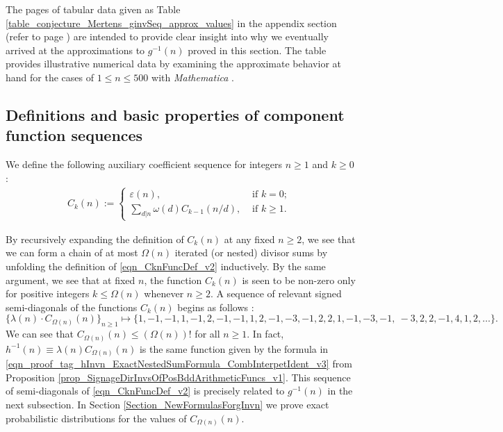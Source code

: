 \documentclass[11pt,reqno,a4letter]{article}
\numberwithin{figure}{section}
\numberwithin{table}{section}
\newcommand{\seqnum}[1]{\href{http://oeis.org/#1}{\color{ProcessBlue}{\underline{#1}}}}
\theoremstyle{plain}
\numberwithin{theorem}{section}
\theoremstyle{definition}
\begin{document}
The pages of tabular data given as Table \ref{table_conjecture_Mertens_ginvSeq_approx_values} 
in the appendix section (refer to 
page \pageref{table_conjecture_Mertens_ginvSeq_approx_values}) are intended to 
provide clear insight into why we eventually arrived at the approximations to 
$g^{-1}(n)$ proved in this section. The table provides illustrative 
numerical data by examining the approximate behavior 
at hand for the cases of $1 \leq n \leq 500$ with \emph{Mathematica} 
\cite{SCHMIDT-MERTENS-COMPUTATIONS}. 

\subsection{Definitions and basic properties of component function sequences} 

We define the following auxiliary coefficient sequence for integers $n \geq 1$ and $k \geq 0$: 
\begin{align} 
\label{eqn_CknFuncDef_v2} 
C_k(n) := \begin{cases} 
     \varepsilon(n), & \text{ if $k = 0$; } \\ 
     \sum\limits_{d|n} \omega(d) C_{k-1}(n/d), & \text{ if $k \geq 1$. } 
     \end{cases} 
\end{align} 

By recursively expanding the definition of $C_k(n)$ 
at any fixed $n \geq 2$, we see that 
we can form a chain of at most $\Omega(n)$ iterated (or nested) divisor sums by 
unfolding the definition of \eqref{eqn_CknFuncDef_v2} inductively. 
By the same argument, we see that at fixed $n$, the function 
$C_k(n)$ is seen to be non-zero only for positive integers 
$k \leq \Omega(n)$ whenever $n \geq 2$. 
A sequence of relevant signed semi-diagonals of the functions $C_k(n)$ begins as follows 
\cite[\seqnum{A008480}]{OEIS}: 
\[
\{\lambda(n) \cdot C_{\Omega(n)}(n) \}_{n \geq 1} \mapsto \{
     1, -1, -1, 1, -1, 2, -1, -1, 1, 2, -1, -3, -1, 2, 2, 1, -1, -3, -1, \
     -3, 2, 2, -1, 4, 1, 2, \ldots \}. 
\]
We can see that $C_{\Omega(n)}(n) \leq (\Omega(n))!$ for all $n \geq 1$. In fact, 
$h^{-1}(n) \equiv \lambda(n) C_{\Omega(n)}(n)$ is the same function given by 
the formula in \eqref{eqn_proof_tag_hInvn_ExactNestedSumFormula_CombInterpetIdent_v3} from 
Proposition \ref{prop_SignageDirInvsOfPosBddArithmeticFuncs_v1}. 
This sequence of semi-diagonals of 
\eqref{eqn_CknFuncDef_v2} 
is precisely related to $g^{-1}(n)$ in the next subsection. 
In Section \ref{Section_NewFormulasForgInvn} 
we prove exact probabilistic distributions for the values of 
$C_{\Omega(n)}(n)$. 
\end{document}
